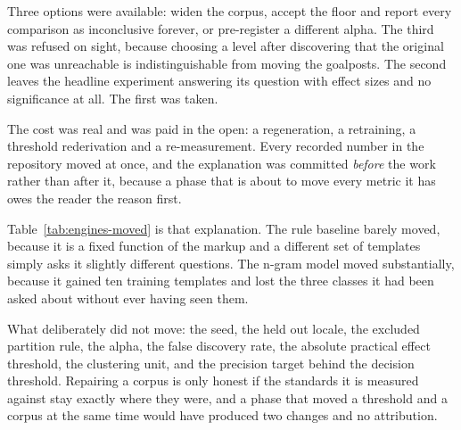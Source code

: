 \begin{table}[htbp]
  \centering
  \caption{What widening the corpus did to the power of the design. More
  resamples would not have helped: at the original cluster count the test was
  already exhaustive.}
  \label{tab:power-repair}
  
\end{table}

Three options were available: widen the corpus, accept the floor and report
every comparison as inconclusive forever, or pre-register a different alpha. The
third was refused on sight, because choosing a level after discovering that the
original one was unreachable is indistinguishable from moving the goalposts. The
second leaves the headline experiment answering its question with effect sizes
and no significance at all. The first was taken.

The cost was real and was paid in the open: a regeneration, a retraining, a
threshold rederivation and a re-measurement. Every recorded number in the
repository moved at once, and the explanation was committed \emph{before} the
work rather than after it, because a phase that is about to move every metric it
has owes the reader the reason first.

\begin{table}[htbp]
  \centering
  \caption{The two classical engines before and after the corpus repair. These
  are not two measurements of the same thing: the test partition afterwards is a
  different set of templates. They are here because a moved metric owes an
  explanation, not because the columns are being averaged.}
  \label{tab:engines-moved}
  
\end{table}

Table~\ref{tab:engines-moved} is that explanation. The rule baseline barely
moved, because it is a fixed function of the markup and a different set of
templates simply asks it slightly different questions. The n-gram model moved
substantially, because it gained ten training templates and lost the three
classes it had been asked about without ever having seen them.

What deliberately did not move: the seed, the held out locale, the excluded
partition rule, the alpha, the false discovery rate, the absolute practical
effect threshold, the clustering unit, and the precision target behind the
decision threshold. Repairing a corpus is only honest if the standards it is
measured against stay exactly where they were, and a phase that moved a
threshold and a corpus at the same time would have produced two changes and no
attribution.
